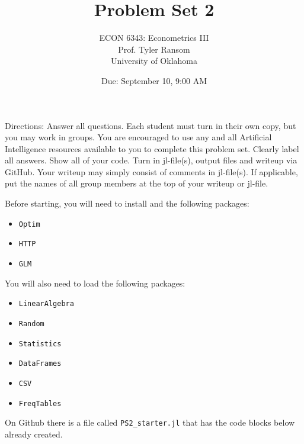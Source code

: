 \documentclass[12pt,english]{article}
\begin{document}
\title{Problem Set 2}
\author{ECON 6343: Econometrics III\\
Prof. Tyler Ransom\\
University of Oklahoma}
\date{Due: September 10, 9:00 AM}

\maketitle
Directions: Answer all questions. Each student must turn in their own copy, but you may work in groups. You are encouraged to use any and all Artificial Intelligence resources available to you to complete this problem set. Clearly label all answers. Show all of your code. Turn in jl-file(s), output files and writeup via GitHub. Your writeup may simply consist of comments in jl-file(s). If applicable, put the names of all group members at the top of your writeup or jl-file.


Before starting, you will need to install and the following packages:
\begin{itemize}
    \item[~] \texttt{Optim} 
    \item[~] \texttt{HTTP} 
    \item[~] \texttt{GLM} 
\end{itemize}

You will also need to load the following packages:
\begin{itemize}
    \item[~] \texttt{LinearAlgebra} 
    \item[~] \texttt{Random} 
    \item[~] \texttt{Statistics} 
    \item[~] \texttt{DataFrames} 
    \item[~] \texttt{CSV} 
    \item[~] \texttt{FreqTables}
\end{itemize}

On Github there is a file called \texttt{PS2\_starter.jl} that has the code blocks below already created.
\end{document}
